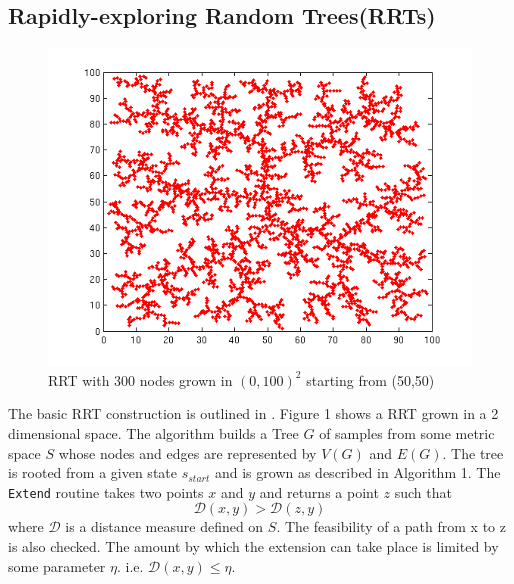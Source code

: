 \documentclass[wcp]{jmlr}
\begin{document}
\subsection{Rapidly-exploring Random Trees(RRTs)}
\label{sec:rrt}
\begin{figure}[htb]
\centering
\label{fig:rrt}
\includegraphics[scale=0.45]{rrt.png}
\caption{RRT with 300 nodes grown in $(0,100)^2$ starting from (50,50)}
\end{figure}

The basic RRT construction is outlined in . Figure 1 shows a RRT grown in a 2 dimensional space. The algorithm builds a Tree $G$ of samples from some metric space $S$ whose nodes and edges are represented by $V(G)$ and $E(G)$. The tree is rooted from a given state $s_{start}$ and is grown as described in Algorithm 1. The \texttt{Extend} routine takes two points $x$ and $y$ and returns a point $z$ such that \[ \mathcal{D}(x,y) > \mathcal{D}(z,y) \] where $\mathcal{D}$ is a distance measure defined on $S$. The feasibility of a path from x to z is also checked. The amount by which the extension can take place is limited by some parameter $\eta$. i.e. $\mathcal{D}(x,y) \leq \eta$.
\end{document}
